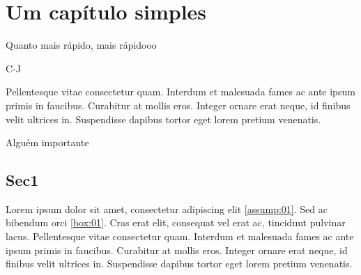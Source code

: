 \documentclass[./main.tex]{subfiles}
\begin{document}
\chapter{Um capítulo simples} \label{chap:2}

\epigraph{Quanto mais rápido, mais rápidooo}{C-J}

\epigraph{Pellentesque vitae consectetur quam. Interdum et malesuada fames ac ante ipsum primis in faucibus. Curabitur at mollis eros. Integer ornare erat neque, id finibus velit ultrices in. Suspendisse dapibus tortor eget lorem pretium venenatis.}{Alguém importante}

\section{Sec1} \label{chp2:sec1}

\par Lorem ipsum dolor sit amet, consectetur adipiscing elit \ref{assump:01}. Sed ac bibendum orci \ref{box:01}. Cras erat elit, consequat vel erat ac, tincidunt pulvinar lacus. Pellentesque vitae consectetur quam. Interdum et malesuada fames ac ante ipsum primis in faucibus. Curabitur at mollis eros. Integer ornare erat neque, id finibus velit ultrices in. Suspendisse dapibus tortor eget lorem pretium venenatis.
\end{document}

